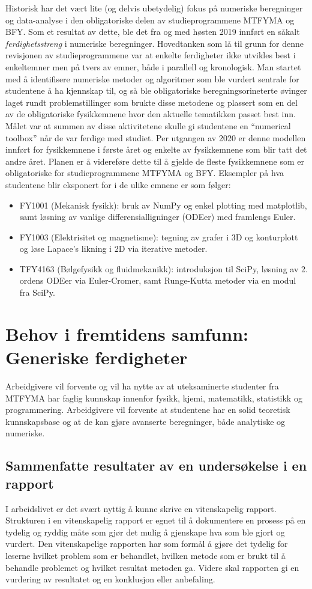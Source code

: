 \documentclass{article}
\begin{document}
Historisk har det vært lite (og delvis ubetydelig) fokus på numeriske beregninger og data-analyse i den obligatoriske delen av studieprogrammene MTFYMA og BFY. Som et resultat av dette, ble det fra og med høsten 2019 innført en såkalt \emph{ferdighetsstreng} i numeriske beregninger. Hovedtanken som lå til grunn for denne revisjonen av studieprogrammene var at enkelte ferdigheter ikke utvikles best i enkeltemner men på tvers av emner, både i parallell og kronologisk. Man startet med å identifisere numeriske metoder og algoritmer som ble vurdert sentrale for studentene å ha kjennskap til, og så ble obligatoriske beregningsorineterte øvinger laget rundt problemstillinger som brukte disse metodene og plassert som en del av de obligatoriske fysikkemnene hvor den aktuelle tematikken passet best inn. Målet var at summen av disse aktivitetene skulle gi studentene en ``numerical toolbox'' når de var ferdige med studiet. Per utgangen av 2020 er denne modellen innført for fysikkemnene i første året og enkelte av fysikkemnene som blir tatt det andre året. Planen er å videreføre dette til å gjelde de fleste fysikkemnene som er obligatoriske for studieprogrammene MTFYMA og BFY. Eksempler på hva studentene blir eksponert for i de ulike emnene er som følger:
\begin{itemize}
  \item FY1001 (Mekanisk fysikk): bruk av NumPy og enkel plotting med matplotlib, samt løsning av vanlige differensialligninger (ODEer) med framlengs Euler.
  \item FY1003 (Elektrisitet og magnetisme): tegning av grafer i 3D og konturplott og løse Lapace's likning i 2D via iterative metoder.
  \item TFY4163 (Bølgefysikk og fluidmekanikk): introduksjon til SciPy, løsning av 2. ordens ODEer via Euler-Cromer, samt Runge-Kutta metoder via en modul fra SciPy.
\end{itemize}

\section{Behov i fremtidens samfunn: Generiske ferdigheter}
\label{sec:behov}
Arbeidgivere vil forvente og vil ha nytte av at uteksaminerte studenter fra MTFYMA har faglig kunnskap innenfor fysikk, kjemi, matematikk, statistikk og programmering.
Arbeidgivere vil forvente at studentene har en solid teoretisk kunnskapsbase og at de kan gjøre avanserte beregninger, både analytiske og numeriske.

\subsection{Sammenfatte resultater av en undersøkelse i en rapport}
I arbeidslivet er det svært nyttig å kunne skrive en vitenskapelig rapport.
Strukturen i en vitenskapelig rapport er egnet til å dokumentere en prosess på en tydelig og ryddig måte som gjør det mulig å gjenskape hva som ble gjort og vurdert.
Den vitenskapelige rapporten har som formål å gjøre det tydelig for leserne hvilket problem som er behandlet, hvilken metode som er brukt til å behandle problemet og hvilket resultat metoden ga.
Videre skal rapporten gi en vurdering av resultatet og en konklusjon eller anbefaling.
\end{document}
